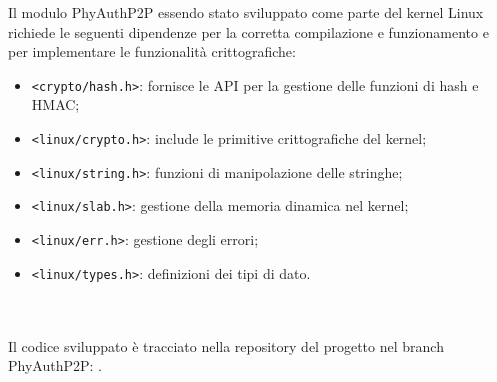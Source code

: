 Il modulo PhyAuthP2P essendo stato sviluppato come parte del kernel Linux richiede le seguenti dipendenze per la corretta compilazione e funzionamento e per implementare le funzionalità crittografiche:
\begin{itemize}
    \item \texttt{<crypto/hash.h>}: fornisce le API per la gestione delle funzioni di hash e HMAC;
    \item \texttt{<linux/crypto.h>}: include le primitive crittografiche del kernel;
    \item \texttt{<linux/string.h>}: funzioni di manipolazione delle stringhe;
    \item \texttt{<linux/slab.h>}: gestione della memoria dinamica nel kernel;
    \item \texttt{<linux/err.h>}: gestione degli errori;
    \item \texttt{<linux/types.h>}: definizioni dei tipi di dato.\\\\\\
\end{itemize}

\noindent Il codice sviluppato è tracciato nella repository del progetto nel branch PhyAuthP2P: \cite{site:openvlc-pa-github}.
